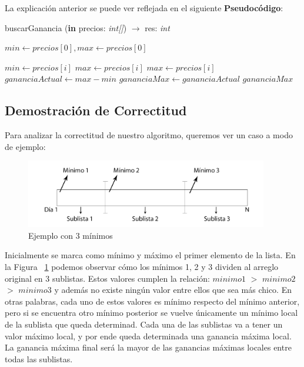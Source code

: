 \indent La explicación anterior se puede ver reflejada en el siguiente
\textbf{Pseudocódigo}:

\begin{algorithm}
\caption{buscarGanancia (\textbf{in} precios: \textsl{int[]}) $\rightarrow$ res:
\textsl{int}}
\begin{algorithmic}[1]
\STATE $min \leftarrow precios[0], max \leftarrow precios[0]$

		\STATE $min \leftarrow precios[i]$
		\STATE $max \leftarrow precios[i]$
	\ENDIF
		\STATE $max \leftarrow precios[i]$
	\ENDIF	
	\STATE $gananciaActual \leftarrow max - min$
		\STATE $gananciaMax \leftarrow gananciaActual$
	\ENDIF
\ENDFOR
\RETURN $gananciaMax$
\end{algorithmic}
\end{algorithm}

\clearpage

\subsection{Demostración de Correctitud}
\indent Para analizar la correctitud de nuestro algoritmo, queremos ver un caso
a modo de ejemplo:

\begin{figure}[h]
\centering                                                       
        \includegraphics[width=300pt]{./figs/sublistas.png}
	\caption{Ejemplo con 3 mínimos}
	\label{fig:sublistas}
\end{figure}

\indent Inicialmente se marca como mínimo y máximo el primer elemento de la lista. En la Figura ~\ref{fig:sublistas} podemos observar cómo los mínimos 1, 2
y 3 dividen al
arreglo original en 3 sublistas. Estos valores cumplen la relación:
$minimo 1$ $>$ $minimo 2$ $>$ $minimo3$ y además no existe ningún valor entre ellos que sea más chico. En otras palabras, cada uno de estos valores es mínimo respecto del mínimo anterior, pero si se encuentra otro mínimo posterior se vuelve únicamente un mínimo local de la sublista que queda determinad. Cada una de las sublistas va a tener un
valor máximo local, y por ende queda determinada una ganancia máxima local. La ganancia máxima final será
la mayor de las ganancias máximas locales entre todas las sublistas.\\

